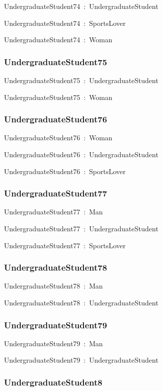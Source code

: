 \documentclass{article}
\begin{document}
UndergraduateStudent74~:~UndergraduateStudent

UndergraduateStudent74~:~SportsLover

UndergraduateStudent74~:~Woman

\subsubsection*{UndergraduateStudent75}

UndergraduateStudent75~:~UndergraduateStudent

UndergraduateStudent75~:~Woman

\subsubsection*{UndergraduateStudent76}

UndergraduateStudent76~:~Woman

UndergraduateStudent76~:~UndergraduateStudent

UndergraduateStudent76~:~SportsLover

\subsubsection*{UndergraduateStudent77}

UndergraduateStudent77~:~Man

UndergraduateStudent77~:~UndergraduateStudent

UndergraduateStudent77~:~SportsLover

\subsubsection*{UndergraduateStudent78}

UndergraduateStudent78~:~Man

UndergraduateStudent78~:~UndergraduateStudent

\subsubsection*{UndergraduateStudent79}

UndergraduateStudent79~:~Man

UndergraduateStudent79~:~UndergraduateStudent

\subsubsection*{UndergraduateStudent8}
\end{document}
